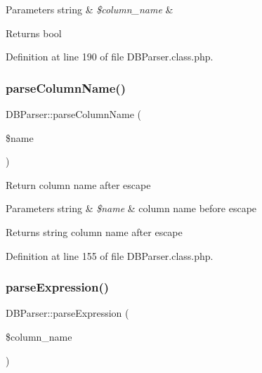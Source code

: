 \begin{DoxyParams}[1]{Parameters}
string & {\em \$column\+\_\+name} & \\
\hline
\end{DoxyParams}
\begin{DoxyReturn}{Returns}
bool 
\end{DoxyReturn}


Definition at line 190 of file D\+B\+Parser.\+class.\+php.

\hypertarget{classDBParser_a4e9d7229c290a48fddd26c278f964dab}{}\label{classDBParser_a4e9d7229c290a48fddd26c278f964dab} 
\subsubsection{\texorpdfstring{parse\+Column\+Name()}{parseColumnName()}}
{\footnotesize\ttfamily D\+B\+Parser\+::parse\+Column\+Name (\begin{DoxyParamCaption}\item[{}]{\$name }\end{DoxyParamCaption})}

Return column name after escape


\begin{DoxyParams}[1]{Parameters}
string & {\em \$name} & column name before escape\\
\hline
\end{DoxyParams}
\begin{DoxyReturn}{Returns}
string column name after escape 
\end{DoxyReturn}


Definition at line 155 of file D\+B\+Parser.\+class.\+php.

\hypertarget{classDBParser_a44e806ac029512b9d54b2f44a0a6385f}{}\label{classDBParser_a44e806ac029512b9d54b2f44a0a6385f} 
\subsubsection{\texorpdfstring{parse\+Expression()}{parseExpression()}}
{\footnotesize\ttfamily D\+B\+Parser\+::parse\+Expression (\begin{DoxyParamCaption}\item[{}]{\$column\+\_\+name }\end{DoxyParamCaption})}


